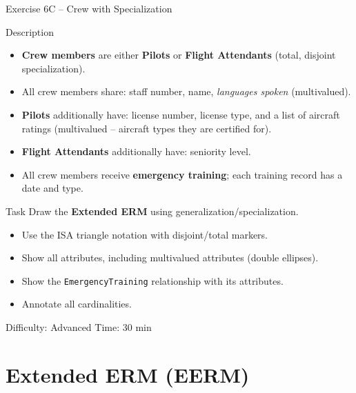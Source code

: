 \documentclass[10pt]{beamer}
\begin{document}
\begin{frame}{Exercise 6C -- Crew with Specialization}
  \begin{block}{Description}
    \begin{itemize}
      \item \textbf{Crew members} are either \textbf{Pilots} or \textbf{Flight Attendants} (total, disjoint specialization).
      \item All crew members share: staff number, name, \emph{languages spoken} (multivalued).
      \item \textbf{Pilots} additionally have: license number, license type, and a list of aircraft ratings (multivalued -- aircraft types they are certified for).
      \item \textbf{Flight Attendants} additionally have: seniority level.
      \item All crew members receive \textbf{emergency training}; each training record has a date and type.
    \end{itemize}
  \end{block}

  \begin{block}{Task}
    Draw the \textbf{Extended ERM} using generalization/specialization.
    \begin{itemize}
      \item Use the ISA triangle notation with disjoint/total markers.
      \item Show all attributes, including multivalued attributes (double ellipses).
      \item Show the \texttt{EmergencyTraining} relationship with its attributes.
      \item Annotate all cardinalities.
    \end{itemize}
  \end{block}

  \begin{alertblock}{Difficulty: Advanced \quad Time: 30 min}
  \end{alertblock}
\end{frame}

\section{Extended ERM (EERM)}

\end{document}
